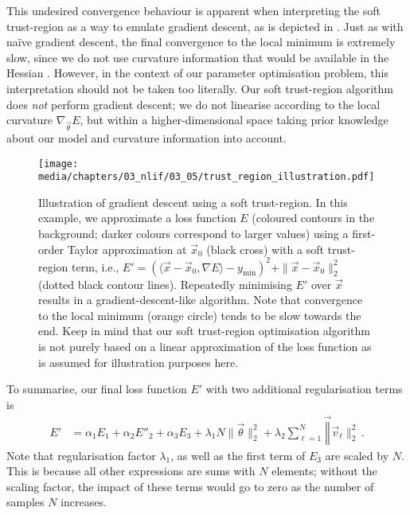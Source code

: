 This undesired convergence behaviour is apparent when interpreting the soft trust-region as a way to emulate gradient descent, as is depicted in .
Just as with na\"ive gradient descent, the final convergence to the local minimum is extremely slow, since we do not use curvature information that would be available in the Hessian \citep[Section~4.3.1]{goodfellow2016deep}.
However, in the context of our parameter optimisation problem, this interpretation should not be taken too literally.
Our soft trust-region algorithm does \emph{not} perform gradient descent; we do not linearise according to the local curvature $\nabla_{\vec \theta} E$, but within a higher-dimensional space taking prior knowledge about our model and curvature information into account.

\begin{figure}
	\centering
	\texttt{[image: media/chapters/03\_nlif/03\_05/trust\_region\_illustration.pdf]}
	\caption[Illustration of gradient descent using a soft trust-region]{Illustration of gradient descent using a soft trust-region.
	In this example, we approximate a loss function $E$ (coloured contours in the background; darker colours correspond to larger values) using a first-order Taylor approximation at $\vec x_0$ (black cross) with a soft trust-region term, i.e., $E' = (\langle \vec x - \vec x_0,  \nabla E \rangle - y_\mathrm{min})^2 + \|\vec x - \vec x_0\|_2^2$ (dotted black contour lines).
	Repeatedly minimising $E'$ over $\vec x$ results in a gradient-descent-like algorithm.
	Note that convergence to the local minimum (orange circle) tends to be slow towards the end.
	Keep in mind that our soft trust-region optimisation algorithm is not purely based on a linear approximation of the loss function as is assumed for illustration purposes here.
	}
	\label{fig:trust_region}
\end{figure}


To summarise, our final loss function $E'$ with two additional regularisation terms is
\begin{align}
	E' &= \alpha_1 E_1 + \alpha_2 E''_2 + \alpha_3 E_3 + \lambda_1 N \|\vec \theta\|_2^2 + \lambda_2 \sum_{\ell = 1}^N \vec \| \vec v_\ell \|_2^2 \,.
	\label{eqn:nlif_parameter_sqp}
\end{align}
Note that regularisation factor $\lambda_1$, as well as the first term of $E_3$ are scaled by $N$.
This is because all other expressions are sums with $N$ elements; without the scaling factor, the impact of these terms would go to zero as the number of samples $N$ increases.

